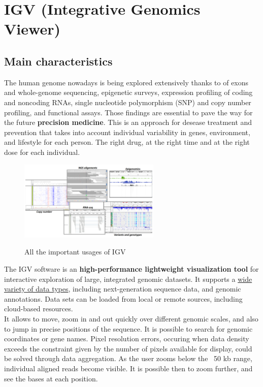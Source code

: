 \graphicspath{{chapters/IGVimages/}}

\chapter{IGV (Integrative Genomics Viewer)} \label{chap: IGV}

\section{Main characteristics}
The human genome nowadays is being explored extensively thanks to of exons and
whole-genome sequencing, epigenetic surveys, expression profiling of coding and
noncoding RNAs, single nucleotide polymorphism (SNP) and copy number profiling,
and functional assays. Those findings are essential to pave the way for the
future \textbf{precision medicine}. This is an approach for desease treatment and
prevention that takes into account individual variability in genes, environment,
and lifestyle for each person. The right drug, at the right time and at the
right dose for each individual. 

\begin{figure}[H]
    \caption{All the important usages of IGV}
    \centering
    \includegraphics[width=0.6\textwidth]{usagesIGV.PNG}
    \label{IGVusages}
\end{figure}

The IGV software is an \textbf{high-performance lightweight visualization tool}
for interactive exploration of large, integrated genomic datasets. It supports a
\underline{wide variety of data types}, including next-generation sequence data,
and genomic annotations. Data sets can be loaded from local or remote sources,
including cloud-based resources. \\
It allows to move, zoom in and out quickly over different genomic scales, and also to
jump in precise positions of the sequence. It is possible to search for genomic coordinates or gene names. Pixel
resolution errors, occuring when data density exceeds the constraint given by
the number of pixels available for display, could be solved through data
aggregation. As the user zooms below the ~50 kb range, individual aligned reads
become visible. It is possible then to zoom further, and see the bases at each
position.
 

